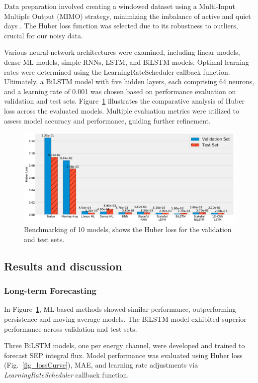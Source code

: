 Data preparation involved creating a windowed dataset using a Multi-Input Multiple Output (MIMO) strategy, minimizing the imbalance of active and quiet days \citep{benson_2020}. The Huber loss function was selected due to its robustness to outliers, crucial for our noisy data.

Various neural network architectures were examined, including linear models, dense ML models, simple RNNs, LSTM, and BiLSTM models. Optimal learning rates were determined using the LearningRateScheduler callback function. Ultimately, a BiLSTM model with five hidden layers, each comprising 64 neurons, and a learning rate of 0.001 was chosen based on performance evaluation on validation and test sets.
Figure~\ref{fig_benchmark} illustrates the comparative analysis of Huber loss across the evaluated models. Multiple evaluation metrics were utilized to assess model accuracy and performance, guiding further refinement.

\begin{figure}[!htp]
	\centering
	\includegraphics[width=\textwidth]{chapter4/figs/models_benchmark.pdf}
	\caption{Benchmarking of 10 models, shows the Huber loss for the validation and test sets.}
	\label{fig_benchmark}
\end{figure}

\subsection{Results and discussion}
\subsubsection{Long-term Forecasting}
In Figure~\ref{fig_benchmark}, ML-based methods showed similar performance, outperforming persistence and moving average models. The BiLSTM model exhibited superior performance across validation and test sets.

Three BiLSTM models, one per energy channel, were developed and trained to forecast SEP integral flux. Model performance was evaluated using Huber loss (Fig.~\ref{fig_lossCurve}), MAE, and learning rate adjustments via \textit{LearningRateScheduler} callback function.

